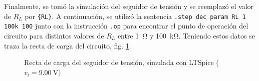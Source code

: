 Finalmente, se tomó la simulación del seguidor de tensión y se reemplazó el
valor de $R_L$ por \verb|{RL}|. A continuación, se utilizó la sentencia
\verb|.step dec param RL 1 100k 100| junto con la instrucción \verb|.op| para
encontrar el punto de operación del circuito para distintos valores de $R_L$
entre \SI{1}{\ohm} y \SI{100}{\kilo\ohm}. Teniendo estos datos se traza la
recta de carga del circuito, fig. \ref{fig:2:recta-spice}.

\begin{figure}[H]
    \centering
    
    \caption{Recta de carga del seguidor de tensión, simulada con LTSpice
    ($v_i = \SI{9.00}{\volt})$}
    \label{fig:2:recta-spice}
\end{figure}
